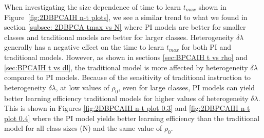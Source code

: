 When investigating the size dependence of time to learn $t_{max}$ shown in Figure~\ref{fig:2DBPCAIH n-t plots}, we see a similar trend to what we found in section \ref{subsec: 2DBPCA tmax vs N} where PI models are better for smaller classes and traditional models are better for larger classes.
Heterogeneity $\delta\lambda$ generally has a negative effect on the time to learn $t_{max}$ for both PI and traditional models.
However, as shown in sections \ref{sec:BPCAIH t vs rho} and \ref{sec:BPCAIH t vs dl}, the traditional model is more affected by heterogeneity $\delta\lambda$ compared to PI models.
Because of the sensitivity of traditional instruction to heterogeneity $\delta\lambda$, at low values of $\rho_0$, even for large classes, PI models can yield better learning efficiency traditional models for higher values of heterogeneity $\delta\lambda$.
This is shown in Figures \ref{fig:2DBPCAIH n-t plot 0.3} and \ref{fig:2DBPCAIH n-t plot 0.4} where the PI model yields better learning efficiency than the traditional model for all class sizes (N) and the same value of $\rho_0$.

